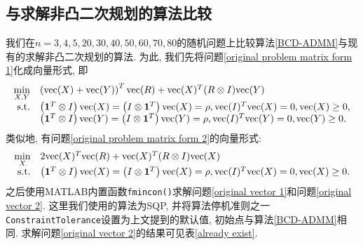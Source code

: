 \subsection{与求解非凸二次规划的算法比较}
我们在$n=3,4,5,20,30,40,50,60,70,80$的随机问题上比较算法\ref{BCD-ADMM}与现有的求解非凸二次规划的算法. 为此, 我们先将问题\eqref{original problem matrix form 1}化成向量形式, 即
\begin{equation}\begin{array}{rl}
	\min\limits_{X,Y} & \left(\mathrm{vec}(X)+\mathrm{vec}(Y)\right)^T\mathrm{vec}(R)+\mathrm{vec}(X)^T(R\otimes I)\mathrm{vec}(Y)\\
	\mathrm{s.t.} & \left(\mathbf{1}^T\otimes I\right)\mathrm{vec}(X)=\left(I\otimes \mathbf{1}^T\right)\mathrm{vec}(X)=\rho,\mathrm{vec}(I)^T\mathrm{vec}(X)=0,\mathrm{vec}(X)\ge0,\\
	 & \left(\mathbf{1}^T\otimes I\right)\mathrm{vec}(Y)=\left(I\otimes \mathbf{1}^T\right)\mathrm{vec}(Y)=\rho,\mathrm{vec}(I)^T\mathrm{vec}(Y)=0,\mathrm{vec}(Y)\ge0.
\end{array}\label{original vector 1}\end{equation}
类似地, 有问题\eqref{original problem matrix form 2}的向量形式:
\begin{equation}\begin{array}{rl}
	\min\limits_{X} & 2\mathrm{vec}(X)^T\mathrm{vec}(R)+\mathrm{vec}(X)^T(R\otimes I)\mathrm{vec}(X)\\
	\mathrm{s.t.} & \left(\mathbf{1}^T\otimes I\right)\mathrm{vec}(X)=\left(I\otimes \mathbf{1}^T\right)\mathrm{vec}(X)=\rho,\mathrm{vec}(I)^T\mathrm{vec}(X)=0,\mathrm{vec}(X)\ge0.
\end{array}\label{original vector 2}\end{equation}
之后使用MATLAB内置函数\texttt{fmincon()}求解问题\eqref{original vector 1}和问题\eqref{original vector 2}. 这里我们使用的算法为SQP, 并将算法停机准则之一\texttt{ConstraintTolerance}设置为上文提到的默认值, 初始点与算法\ref{BCD-ADMM}相同. 求解问题\eqref{original vector 2}的结果可见表\ref{already exist}.
